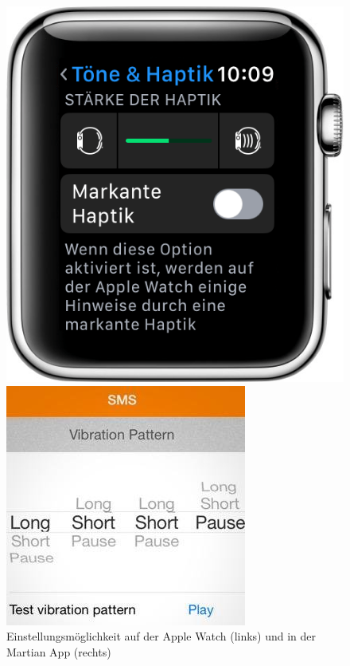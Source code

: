 \begin{figure}[htbp] 
	\centering
	\begin{minipage}[t]{0.4\textwidth}
		\includegraphics[width=\textwidth]{pics/applewatch.png}
	\end{minipage}
	\begin{minipage}[t]{0.4\textwidth}
		\includegraphics[width=\textwidth]{pics/martian.jpg}
	\end{minipage}
	\caption{Einstellungsmöglichkeit auf der Apple Watch (links) und in der Martian App (rechts)}
	\label{fig:Bild10}
\end{figure}

